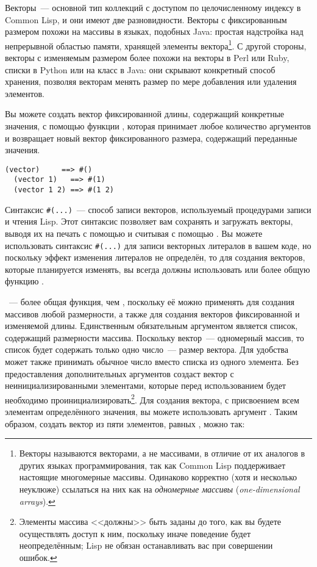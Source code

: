 Векторы~--- основной тип коллекций с доступом по целочисленному индексу в Common Lisp, и они
имеют две разновидности.  Векторы с фиксированным размером похожи на массивы в языках,
подобных Java: простая надстройка над непрерывной областью памяти, хранящей элементы
вектора\footnote{Векторы называются векторами, а не массивами, в отличие от их аналогов в других
  языках программирования, так как Common Lisp поддерживает настоящие многомерные
  массивы.  Одинаково корректно (хотя и несколько неуклюже) ссылаться на них как на
  \textit{одномерные массивы} (\textit{one-dimensional arrays}).}. С другой стороны,
векторы с изменяемым размером более похожи на векторы в Perl или Ruby, списки в Python
или на класс  в Java: они скрывают конкретный способ хранения, позволяя
векторам менять размер по мере добавления или удаления элементов.

Вы можете создать вектор фиксированной длины, содержащий конкретные значения, с помощью
функции , которая принимает любое количество аргументов и возвращает
новый вектор фиксированного размера, содержащий переданные значения.

\begin{lstlisting}[style=lisprepl]
  (vector)     ==> #()
  (vector 1)   ==> #(1)
  (vector 1 2) ==> #(1 2)
\end{lstlisting}

Синтаксис \lstinline!#(...)!~--- способ записи векторов, используемый процедурами
записи и чтения Lisp.  Этот синтаксис позволяет вам сохранять и загружать векторы,
выводя их на печать с помощью  и считывая с помощью .
Вы можете использовать синтаксис \lstinline!#(...)! для
записи векторных литералов в вашем коде, но поскольку эффект изменения литералов не определён,
то для создания векторов, которые планируется изменять, вы всегда должны 
использовать  или более общую функцию .

~--- более общая функция, чем , поскольку её можно
применять для создания массивов любой размерности, а также для создания векторов
фиксированной и изменяемой длины. Единственным обязательным аргументом 
является список, содержащий размерности массива.  Поскольку вектор~--- одномерный массив,
то список будет содержать только одно число~--- размер вектора.  Для удобства
 может также принимать обычное число вместо списка из одного элемента.
Без предоставления дополнительных аргументов  создаст вектор с
неинициализированными элементами, которые перед использованием будет необходимо
проинициализировать\footnote{Элементы массива <<должны>> быть заданы до того, как вы будете осуществлять
  доступ к ним, поскольку иначе поведение будет неопределённым; Lisp не обязан
  останавливать вас при совершении ошибок.}.  Для создания вектора, с присвоением всем
элементам определённого значения, вы можете использовать аргумент .
Таким образом, создать вектор из пяти элементов, равных , можно так:

